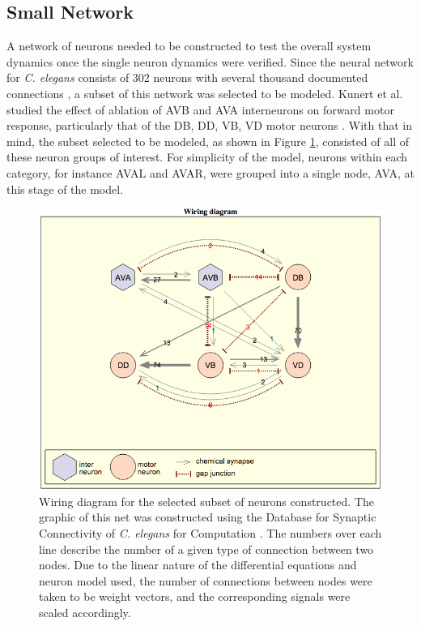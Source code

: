 \documentclass[11pt]{article} %
\begin{document}
\subsection{Small Network}
A network of neurons needed to be constructed to test the overall system dynamics once the single neuron dynamics were verified. Since the neural network for \emph{C. elegans} consists of 302 neurons with several thousand documented connections \cite{Varshney2011}, a subset of this network was selected to be modeled. Kunert et al. studied the effect of ablation of AVB and AVA interneurons on forward motor response, particularly that of the DB, DD, VB, VD motor neurons \cite{Kunert2014}. With that in mind, the subset selected to be modeled, as shown in Figure \ref{fig:f2}, consisted of all of these neuron groups of interest. For simplicity of the model, neurons within each category, for instance  AVAL and AVAR, were grouped into a single node, AVA, at this stage of the model.
\begin{figure}[h!]
\begin{center}
\includegraphics[scale=0.35]{motn_fig2.png} \caption[h2]{Wiring diagram for the selected subset of neurons constructed. The graphic of this net was constructed using the Database for Synaptic Connectivity of \emph{C. elegans} for Computation \cite{Oshio2003}. The numbers over each line describe the number of a given type of connection between two nodes. Due to the linear nature of the differential equations and neuron model used, the number of connections between nodes were taken to be weight vectors, and the corresponding signals were scaled accordingly.} \label{fig:f2} \end{center}
\end{figure}
\end{document}

